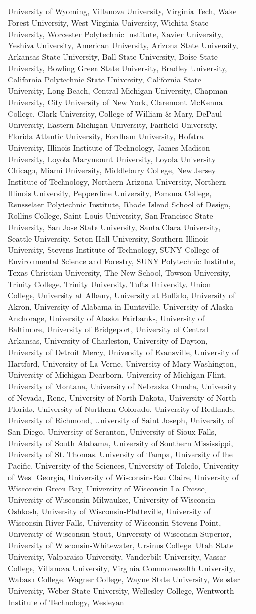 \begin{table*}
{\begin{tabular}{lp{21cm}}
University of Wyoming, Villanova University, Virginia Tech, Wake Forest University, West Virginia University, Wichita State University, Worcester Polytechnic Institute, Xavier University, Yeshiva University, American University, Arizona State University, Arkansas State University, Ball State University, Boise State University, Bowling Green State University, Bradley University, California Polytechnic State University, California State University, Long Beach, Central Michigan University, Chapman University, City University of New York, Claremont McKenna College, Clark University, College of William \& Mary, DePaul University, Eastern Michigan University, Fairfield University, Florida Atlantic University, Fordham University, Hofstra University, Illinois Institute of Technology, James Madison University, Loyola Marymount University, Loyola University Chicago, Miami University, Middlebury College, New Jersey Institute of Technology, Northern Arizona University, Northern Illinois University, Pepperdine University, Pomona College, Rensselaer Polytechnic Institute, Rhode Island School of Design, Rollins College, Saint Louis University, San Francisco State University, San Jose State University, Santa Clara University, Seattle University, Seton Hall University, Southern Illinois University, Stevens Institute of Technology, SUNY College of Environmental Science and Forestry, SUNY Polytechnic Institute, Texas Christian University, The New School, Towson University, Trinity College, Trinity University, Tufts University, Union College, University at Albany, University at Buffalo, University of Akron, University of Alabama in Huntsville, University of Alaska Anchorage, University of Alaska Fairbanks, University of Baltimore, University of Bridgeport, University of Central Arkansas, University of Charleston, University of Dayton, University of Detroit Mercy, University of Evansville, University of Hartford, University of La Verne, University of Mary Washington, University of Michigan-Dearborn, University of Michigan-Flint, University of Montana, University of Nebraska Omaha, University of Nevada, Reno, University of North Dakota, University of North Florida, University of Northern Colorado, University of Redlands, University of Richmond, University of Saint Joseph, University of San Diego, University of Scranton, University of Sioux Falls, University of South Alabama, University of Southern Mississippi, University of St. Thomas, University of Tampa, University of the Pacific, University of the Sciences, University of Toledo, University of West Georgia, University of Wisconsin-Eau Claire, University of Wisconsin-Green Bay, University of Wisconsin-La Crosse, University of Wisconsin-Milwaukee, University of Wisconsin-Oshkosh, University of Wisconsin-Platteville, University of Wisconsin-River Falls, University of Wisconsin-Stevens Point, University of Wisconsin-Stout, University of Wisconsin-Superior, University of Wisconsin-Whitewater, Ursinus College, Utah State University, Valparaiso University, Vanderbilt University, Vassar College, Villanova University, Virginia Commonwealth University, Wabash College, Wagner College, Wayne State University, Webster University, Weber State University, Wellesley College, Wentworth Institute of Technology, Wesleyan 
\end{tabular}}
\end{table*}
